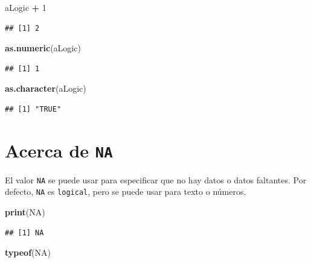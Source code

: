 \documentclass[]{book}
\newenvironment{Shaded}{\begin{snugshade}}{\end{snugshade}}
\newcommand{\KeywordTok}[1]{\textcolor[rgb]{0.13,0.29,0.53}{\textbf{#1}}}
\newcommand{\DecValTok}[1]{\textcolor[rgb]{0.00,0.00,0.81}{#1}}
\newcommand{\StringTok}[1]{\textcolor[rgb]{0.31,0.60,0.02}{#1}}
\newcommand{\OtherTok}[1]{\textcolor[rgb]{0.56,0.35,0.01}{#1}}
\newcommand{\OperatorTok}[1]{\textcolor[rgb]{0.81,0.36,0.00}{\textbf{#1}}}
\newcommand{\NormalTok}[1]{#1}
\begin{document}
\begin{Shaded}
\begin{Highlighting}[]
\NormalTok{aLogic }\OperatorTok{+}\StringTok{ }\DecValTok{1}
\end{Highlighting}
\end{Shaded}

\begin{verbatim}
## [1] 2
\end{verbatim}

\begin{Shaded}
\begin{Highlighting}[]
\KeywordTok{as.numeric}\NormalTok{(aLogic)}
\end{Highlighting}
\end{Shaded}

\begin{verbatim}
## [1] 1
\end{verbatim}

\begin{Shaded}
\begin{Highlighting}[]
\KeywordTok{as.character}\NormalTok{(aLogic)}
\end{Highlighting}
\end{Shaded}

\begin{verbatim}
## [1] "TRUE"
\end{verbatim}

\section{\texorpdfstring{Acerca de
\texttt{NA}}{Acerca de NA}}\label{acerca-de-na}

El valor \texttt{NA} se puede usar para especificar que no hay datos o
datos faltantes. Por defecto, \texttt{NA} es \texttt{logical}, pero se
puede usar para texto o números.

\begin{Shaded}
\begin{Highlighting}[]
\KeywordTok{print}\NormalTok{(}\OtherTok{NA}\NormalTok{)}
\end{Highlighting}
\end{Shaded}

\begin{verbatim}
## [1] NA
\end{verbatim}

\begin{Shaded}
\begin{Highlighting}[]
\KeywordTok{typeof}\NormalTok{(}\OtherTok{NA}\NormalTok{)}
\end{Highlighting}
\end{Shaded}
\end{document}
